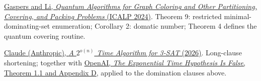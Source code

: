 \documentclass[11pt,a4paper]{article}
\theoremstyle{problemstyle}
\newenvironment{algorithmindex}[1]{%
  \begin{enumerate}[label={[#1.\arabic*]},leftmargin=3.4em,labelsep=0.6em,itemsep=4pt,topsep=3pt,parsep=0pt]
  \small
}{\end{enumerate}}
\begin{document}
\begin{algorithmindex}{21}
\item \href{https://arxiv.org/pdf/2311.08042}{Gaspers and Li, \emph{Quantum Algorithms for Graph Coloring and Other Partitioning, Covering, and Packing Problems} (ICALP 2024)}. Theorem 9: restricted minimal-dominating-set enumeration; Corollary 2: domatic number; Theorem 4 defines the quantum covering routine.
\item \href{https://github.com/anthropics/formal-math/tree/main/eth}{Claude (Anthropic), \emph{A $2^{o(n)}$ Time Algorithm for 3-SAT} (2026)}. Long-clause shortening; together with \href{https://github.com/openai/math/blob/main/preprints/The-Exponential-Time-Hypothesis-is-False-October-25-2026/paper.pdf}{OpenAI, \emph{The Exponential Time Hypothesis Is False}, Theorem 1.1 and Appendix D}, applied to the domination clauses above.
\end{algorithmindex}
\end{document}
